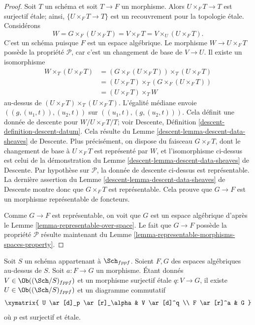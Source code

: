 \begin{proof}
Soit $T$ un schéma et soit $T \to F$ un morphisme. Alors
$U \times_F T \to T$ est surjectif \'etale; ainsi, $\{U \times_F T \to T\}$ est
un recouvrement pour la topologie \'etale. Considérons
$$
W = G \times_F (U \times_F T) = V \times_F T = V \times_U (U \times_F T).
$$
C'est un schéma puisque $F$ est un espace algébrique. Le morphisme
$W \to U \times_F T$ possède la propriété $\mathcal{P}$, car c'est un
changement de base de $V \to U$. Il existe un isomorphisme
\begin{align*}
W \times_T (U \times_F T) & =
(G \times_F (U \times_F T)) \times_T (U \times_F T) \\
& = (U \times_F T) \times_T (G \times_F (U \times_F T)) \\
& = (U \times_F T) \times_T W
\end{align*}
au-dessus de $(U \times_F T) \times_T (U \times_F T)$. L'égalité médiane envoie
$((g, (u_1, t)), (u_2, t))$ sur $((u_1, t), (g, (u_2, t)))$.
Cela définit une donnée de descente pour $W/U \times_F T/T$; voir
Descente, Définition \ref{descent-definition-descent-datum}.
Cela résulte du
Lemme \ref{descent-lemma-descent-data-sheaves} de Descente.
Plus précisément, on dispose du faisceau $G \times_F T$, dont le
changement de base à $U \times_F T$ est représenté par $W$, et l'isomorphisme
ci-dessus est celui de la démonstration du
Lemme \ref{descent-lemma-descent-data-sheaves} de Descente.
Par hypothèse sur $\mathcal{P}$, la donnée de descente ci-dessus est représentable.
La dernière assertion du
Lemme \ref{descent-lemma-descent-data-sheaves} de Descente
montre donc que $G \times_F T$ est représentable. Cela prouve que
$G \to F$ est un morphisme représentable de foncteurs.

\medskip\noindent
Comme $G \to F$ est représentable, on voit que $G$ est un espace algébrique d'après le
Lemme \ref{lemma-representable-over-space}. Le fait que $G \to F$ possède
la propriété $\mathcal{P}$ résulte maintenant du
Lemme \ref{lemma-representable-morphisms-spaces-property}.
\end{proof}

\begin{lemma}
\label{lemma-lift-morphism-presentations}
Soit $S$ un schéma appartenant à $\Sch_{fppf}$.
Soient $F, G$ des espaces algébriques au-dessus de $S$.
Soit $a : F \to G$ un morphisme.
Étant donnés $V \in \Ob((\Sch/S)_{fppf})$
et un morphisme surjectif \'etale $q : V \to G$, il existe
$U \in \Ob((\Sch/S)_{fppf})$
et un diagramme commutatif
$$
\xymatrix{
U \ar[d]_p \ar[r]_\alpha &
V \ar[d]^q \\
F \ar[r]^a & G
}
$$
où $p$ est surjectif et \'etale.
\end{lemma}

